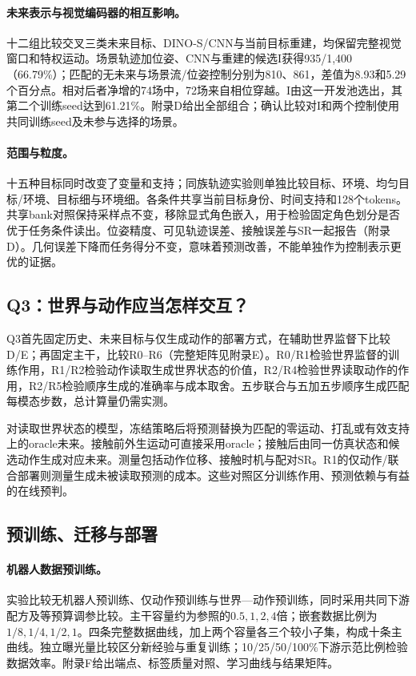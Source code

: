 \paragraph{未来表示与视觉编码器的相互影响。}
十二组比较交叉三类未来目标、DINO-S/CNN与当前目标重建，均保留完整视觉窗口和特权运动。场景轨迹加位姿、CNN与重建的候选I获得935/1,400（66.79\%）；匹配的无未来与场景流/位姿控制分别为810、861，差值为8.93和5.29个百分点。相对后者净增的74场中，72场来自相位穿越。I由这一开发池选出，其第二个训练seed达到61.21\%。附录D给出全部组合；确认比较对I和两个控制使用共同训练seed及未参与选择的场景。

\paragraph{范围与粒度。}
十五种目标同时改变了变量和支持；同族轨迹实验则单独比较目标、环境、均匀目标/环境、目标细与环境细。各条件共享当前目标身份、时间支持和128个tokens。共享bank对照保持采样点不变，移除显式角色嵌入，用于检验固定角色划分是否优于任务条件读出。位姿精度、可见轨迹误差、接触误差与SR一起报告（附录D）。几何误差下降而任务得分不变，意味着预测改善，不能单独作为控制表示更优的证据。

\subsection{Q3：世界与动作应当怎样交互？}


Q3首先固定历史、未来目标与仅生成动作的部署方式，在辅助世界监督下比较D/E；再固定主干，比较R0--R6（完整矩阵见附录E）。R0/R1检验世界监督的训练作用，R1/R2检验动作读取生成世界状态的价值，R2/R4检验世界读取动作的作用，R2/R5检验顺序生成的准确率与成本取舍。五步联合与五加五步顺序生成匹配每模态步数，总计算量仍需实测。

对读取世界状态的模型，冻结策略后将预测替换为匹配的零运动、打乱或有效支持上的oracle未来。接触前外生运动可直接采用oracle；接触后由同一仿真状态和候选动作生成对应未来。测量包括动作位移、接触时机与配对SR。R1的仅动作/联合部署则测量生成未被读取预测的成本。这些对照区分训练作用、预测依赖与有益的在线预判。

\subsection{预训练、迁移与部署}

\paragraph{机器人数据预训练。}
实验比较无机器人预训练、仅动作预训练与世界—动作预训练，同时采用共同下游配方及等预算调参比较。主干容量约为参照的$0.5,1,2,4$倍；嵌套数据比例为$1/8,1/4,1/2,1$。四条完整数据曲线，加上两个容量各三个较小子集，构成十条主曲线。独立曝光量比较区分新经验与重复训练；10/25/50/100\%下游示范比例检验数据效率。附录F给出端点、标签质量对照、学习曲线与结果矩阵。

